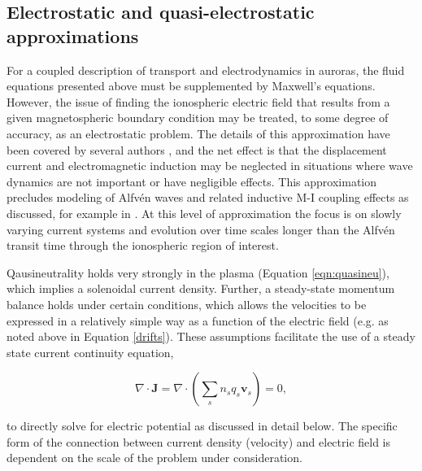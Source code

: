 \documentclass[11pt,letterpaper]{article}
\begin{document}
\subsection{Electrostatic and quasi-electrostatic approximations} \label{EM}

For a coupled description of transport and electrodynamics in auroras, the fluid equations presented above must be supplemented by Maxwell's equations.  However, the issue of finding the ionospheric electric field that results from a given magnetospheric boundary condition may be treated, to some degree of accuracy, as an electrostatic problem.  The details of this approximation have been covered by several authors \citep[e.g.][and references therein]{Stmaurice:1996}, and the net effect is that the displacement current and electromagnetic induction may be neglected in situations where wave dynamics are not important or have negligible effects.  This approximation precludes modeling of Alfv\'en waves and related inductive M-I coupling effects as discussed, for example in \citet{Lotko:2004}.  At this level of approximation the focus is on slowly varying current systems and evolution over time scales longer than the Alfv\'en transit time through the ionospheric region of interest.    %

Qausineutrality holds very strongly in the plasma (Equation \ref{eqn:quasineu}), which implies a solenoidal current density.  Further, a steady-state momentum balance holds under certain conditions, which allows the velocities to be expressed in a relatively simple way as a function of the electric field (e.g. as noted above in Equation \ref{drifts}).  These assumptions facilitate the use of a steady state current continuity equation,
\begin{linenomath*} \begin{equation}
\nabla \cdot \mathbf{J} = \nabla \cdot \left( \sum_s n_s q_s \mathbf{v}_s \right)  = 0, \label{divJSS} 
\end{equation} \end{linenomath*}
to directly solve for electric potential as discussed in detail below.  The specific form of the connection between current density (velocity) and electric field is dependent on the scale of the problem under consideration.   
\end{document}
